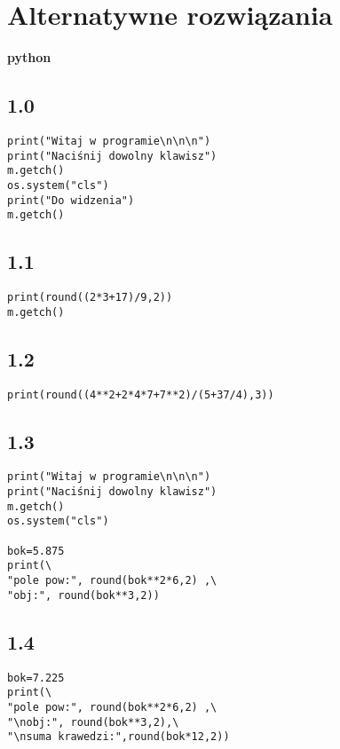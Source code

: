 \documentclass[a4paper,11pt]{article}
\begin{document}
\section{Alternatywne rozwiązania}
\begin{center}
\large \textbf{python}
\end{center}
\begin{multicols}{2}
\begin{flushleft}
\subsection*{1.0}
\begin{verbatim}
print("Witaj w programie\n\n\n")
print("Naciśnij dowolny klawisz")
m.getch()
os.system("cls")
print("Do widzenia")
m.getch()
\end{verbatim}

\subsection*{1.1}

\begin{verbatim}
print(round((2*3+17)/9,2))
m.getch()
\end{verbatim}

\subsection*{1.2}

\begin{verbatim}
print(round((4**2+2*4*7+7**2)/(5+37/4),3))
\end{verbatim}

\subsection*{1.3}

\begin{verbatim}
print("Witaj w programie\n\n\n")
print("Naciśnij dowolny klawisz")
m.getch()
os.system("cls")

bok=5.875
print(\
"pole pow:", round(bok**2*6,2) ,\
"obj:", round(bok**3,2))
\end{verbatim}

\subsection*{1.4}
\begin{verbatim}
bok=7.225
print(\
"pole pow:", round(bok**2*6,2) ,\
"\nobj:", round(bok**3,2),\
"\nsuma krawedzi:",round(bok*12,2))
\end{verbatim}


\end{flushleft}
\end{multicols}
\end{document}
